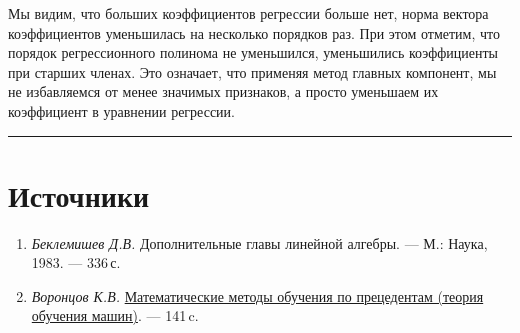 \documentclass[11pt,a4paper]{article}
\providecommand{\tightlist}{%
  \setlength{\itemsep}{0pt}\setlength{\parskip}{0pt}}
\begin{document}
    \begin{center}
    \end{center}

    Мы видим, что больших коэффициентов регрессии больше нет, норма вектора
коэффициентов уменьшилась на несколько порядков раз. При этом отметим,
что порядок регрессионного полинома не уменьшился, уменьшились
коэффициенты при старших членах. Это означает, что применяя метод
главных компонент, мы не избавляемся от менее значимых признаков, а
просто уменьшаем их коэффициент в уравнении регрессии.

    \begin{center}\rule{0.5\linewidth}{0.5pt}\end{center}

    \hypertarget{ux438ux441ux442ux43eux447ux43dux438ux43aux438}{%
\section{Источники}\label{ux438ux441ux442ux43eux447ux43dux438ux43aux438}}

\begin{enumerate}
\def\labelenumi{\arabic{enumi}.}
\tightlist
\item
  \emph{Беклемишев Д.В.} Дополнительные главы линейной алгебры. --- М.:
  Наука, 1983. --- 336\,с.
\item
  \emph{Воронцов К.В.}
  \href{http://www.machinelearning.ru/wiki/images/6/6d/Voron-ML-1.pdf}{Математические
  методы обучения по прецедентам (теория обучения машин)}. --- 141\,c.
\end{enumerate}
\end{document}
